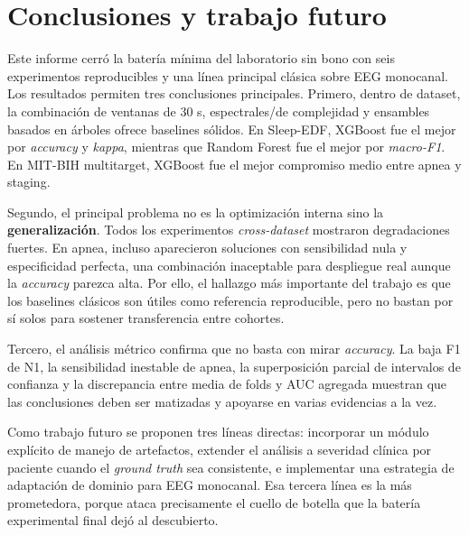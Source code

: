 \section{Conclusiones y trabajo futuro}

Este informe cerr\'o la bater\'ia m\'inima del laboratorio sin bono con seis experimentos reproducibles y una l\'inea principal cl\'asica sobre EEG monocanal. Los resultados permiten tres conclusiones principales. Primero, dentro de dataset, la combinaci\'on de ventanas de 30 s,  espectrales/de complejidad y ensambles basados en \'arboles ofrece baselines s\'olidos. En Sleep-EDF, XGBoost fue el mejor por \emph{accuracy} y \emph{kappa}, mientras que Random Forest fue el mejor por \emph{macro-F1}. En MIT-BIH multitarget, XGBoost fue el mejor compromiso medio entre apnea y staging.

Segundo, el principal problema no es la optimizaci\'on interna sino la \textbf{generalizaci\'on}. Todos los experimentos \emph{cross-dataset} mostraron degradaciones fuertes. En apnea, incluso aparecieron soluciones con sensibilidad nula y especificidad perfecta, una combinaci\'on inaceptable para despliegue real aunque la \emph{accuracy} parezca alta. Por ello, el hallazgo m\'as importante del trabajo es que los baselines cl\'asicos son \'utiles como referencia reproducible, pero no bastan por s\'i solos para sostener transferencia entre cohortes.

Tercero, el an\'alisis m\'etrico confirma que no basta con mirar \emph{accuracy}. La baja F1 de N1, la sensibilidad inestable de apnea, la superposici\'on parcial de intervalos de confianza y la discrepancia entre media de folds y AUC agregada muestran que las conclusiones deben ser matizadas y apoyarse en varias evidencias a la vez.

Como trabajo futuro se proponen tres l\'ineas directas: incorporar un m\'odulo expl\'icito de manejo de artefactos, extender el an\'alisis a severidad cl\'inica por paciente cuando el \emph{ground truth} sea consistente, e implementar una estrategia de adaptaci\'on de dominio para EEG monocanal. Esa tercera l\'inea es la m\'as prometedora, porque ataca precisamente el cuello de botella que la bater\'ia experimental final dej\'o al descubierto.
